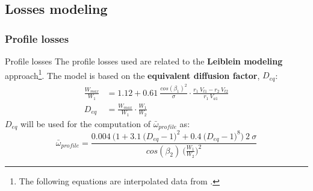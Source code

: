 \subsection{Losses modeling}
\subsubsection{Profile losses}
	\begin{frame}{Profile losses}
		The profile losses used are related to the \textbf{Leiblein modeling} approach\footnote{The following equations are interpolated data from \cite[Sec. 6.4]{axial2004}.}.
		\newline
		The model is based on the \textbf{equivalent diffusion factor}, $D_{eq}$:
		\begin{align}
			\frac{W_{max}}{W_1} & = 1.12 + 0.61 \ \frac{cos(\beta_1)^2}{\sigma} \cdot \frac{r_1 \ V_{t1} - r_2 \ V_{t2}}{r_1 \ V_{a1}} \nonumber \\
			D_{eq} & = \frac{W_{max}}{W_1} \cdot \frac{W_1}{W_2} \nonumber  
		\end{align}
		$D_{eq}$ will be used for the computation of $\bar{\omega}_{profile}$ as:
		\begin{equation}
			\bar{\omega}_{profile} = \frac{0.004 \ \Big( 1 + 3.1 \ \big( D_{eq} - 1 \big)^2 + 0.4 \ \big( D_{eq} - 1 \big)^8 \Big) \ 2 \ \sigma}{cos(\beta_2) \ \Big( \frac{W_1}{W_2} \Big)^2} \nonumber
		\end{equation}
	\end{frame}
